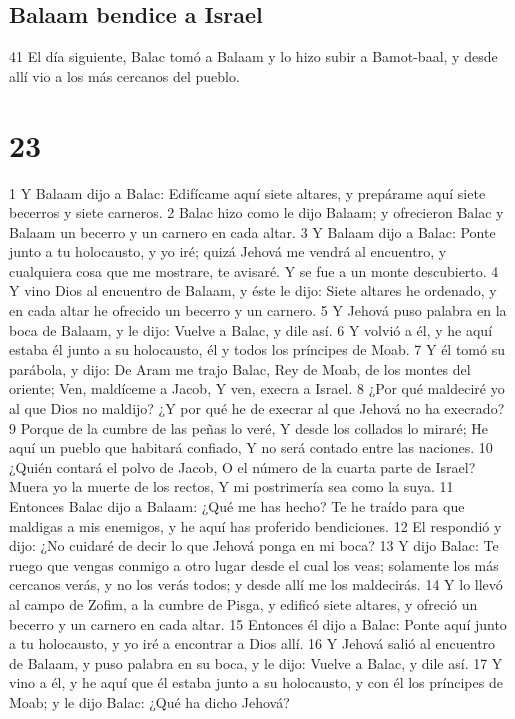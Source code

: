 \section*{Balaam bendice a Israel}

41 El día siguiente, Balac tomó a Balaam y lo hizo subir a Bamot-baal, y desde allí vio a los más cercanos del pueblo.

\chapter{23}

1 Y Balaam dijo a Balac: Edifícame aquí siete altares, y prepárame aquí siete becerros y siete carneros.
2 Balac hizo como le dijo Balaam; y ofrecieron Balac y Balaam un becerro y un carnero en cada altar.
3 Y Balaam dijo a Balac: Ponte junto a tu holocausto, y yo iré; quizá Jehová me vendrá al encuentro, y cualquiera cosa que me mostrare, te avisaré. Y se fue a un monte descubierto.
4 Y vino Dios al encuentro de Balaam, y éste le dijo: Siete altares he ordenado, y en cada altar he ofrecido un becerro y un carnero.
5 Y Jehová puso palabra en la boca de Balaam, y le dijo: Vuelve a Balac, y dile así.
6 Y volvió a él, y he aquí estaba él junto a su holocausto, él y todos los príncipes de Moab.
7 Y él tomó su parábola, y dijo:
De Aram me trajo Balac,
Rey de Moab, de los montes del oriente;
Ven, maldíceme a Jacob,
Y ven, execra a Israel.
8 ¿Por qué maldeciré yo al que Dios no maldijo?
¿Y por qué he de execrar al que Jehová no ha execrado?
9 Porque de la cumbre de las peñas lo veré,
Y desde los collados lo miraré;
He aquí un pueblo que habitará confiado,
Y no será contado entre las naciones.
10 ¿Quién contará el polvo de Jacob,
O el número de la cuarta parte de Israel?
Muera yo la muerte de los rectos,
Y mi postrimería sea como la suya.
11 Entonces Balac dijo a Balaam: ¿Qué me has hecho? Te he traído para que maldigas a mis enemigos, y he aquí has proferido bendiciones.
12 El respondió y dijo: ¿No cuidaré de decir lo que Jehová ponga en mi boca?
13 Y dijo Balac: Te ruego que vengas conmigo a otro lugar desde el cual los veas; solamente los más cercanos verás, y no los verás todos; y desde allí me los maldecirás.
14 Y lo llevó al campo de Zofim, a la cumbre de Pisga, y edificó siete altares, y ofreció un becerro y un carnero en cada altar.
15 Entonces él dijo a Balac: Ponte aquí junto a tu holocausto, y yo iré a encontrar a Dios allí.
16 Y Jehová salió al encuentro de Balaam, y puso palabra en su boca, y le dijo: Vuelve a Balac, y dile así.
17 Y vino a él, y he aquí que él estaba junto a su holocausto, y con él los príncipes de Moab; y le dijo Balac: ¿Qué ha dicho Jehová?
